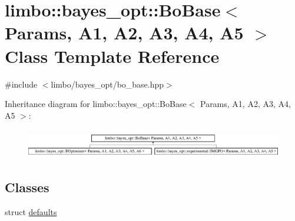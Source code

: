 \hypertarget{classlimbo_1_1bayes__opt_1_1_bo_base}{}\section{limbo\+:\+:bayes\+\_\+opt\+:\+:Bo\+Base$<$ Params, A1, A2, A3, A4, A5 $>$ Class Template Reference}
\label{classlimbo_1_1bayes__opt_1_1_bo_base}


{\ttfamily \#include $<$limbo/bayes\+\_\+opt/bo\+\_\+base.\+hpp$>$}

Inheritance diagram for limbo\+:\+:bayes\+\_\+opt\+:\+:Bo\+Base$<$ Params, A1, A2, A3, A4, A5 $>$\+:\begin{figure}[H]
\begin{center}
\leavevmode
\includegraphics[height=1.308411cm]{classlimbo_1_1bayes__opt_1_1_bo_base}
\end{center}
\end{figure}
\subsection*{Classes}
\begin{DoxyCompactItemize}
\item 
struct \hyperlink{structlimbo_1_1bayes__opt_1_1_bo_base_1_1defaults}{defaults}
\end{DoxyCompactItemize}
